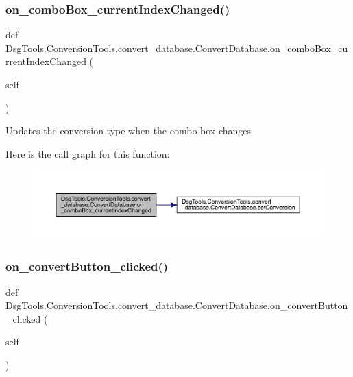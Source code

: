 \subsubsection{\texorpdfstring{on\+\_\+combo\+Box\+\_\+current\+Index\+Changed()}{on\_comboBox\_currentIndexChanged()}}
{\footnotesize\ttfamily def Dsg\+Tools.\+Conversion\+Tools.\+convert\+\_\+database.\+Convert\+Database.\+on\+\_\+combo\+Box\+\_\+current\+Index\+Changed (\begin{DoxyParamCaption}\item[{}]{self }\end{DoxyParamCaption})}

\begin{DoxyVerb}Updates the conversion type when the combo box changes
\end{DoxyVerb}
 Here is the call graph for this function\+:
\nopagebreak
\begin{figure}[H]
\begin{center}
\leavevmode
\includegraphics[width=350pt]{class_dsg_tools_1_1_conversion_tools_1_1convert__database_1_1_convert_database_a8082ef2aa0afb9d44f39c8192bb74d3b_cgraph}
\end{center}
\end{figure}
\mbox{\label{class_dsg_tools_1_1_conversion_tools_1_1convert__database_1_1_convert_database_a17a29f0021797382f0c379c95a989ff7}} 
\subsubsection{\texorpdfstring{on\+\_\+convert\+Button\+\_\+clicked()}{on\_convertButton\_clicked()}}
{\footnotesize\ttfamily def Dsg\+Tools.\+Conversion\+Tools.\+convert\+\_\+database.\+Convert\+Database.\+on\+\_\+convert\+Button\+\_\+clicked (\begin{DoxyParamCaption}\item[{}]{self }\end{DoxyParamCaption})}

